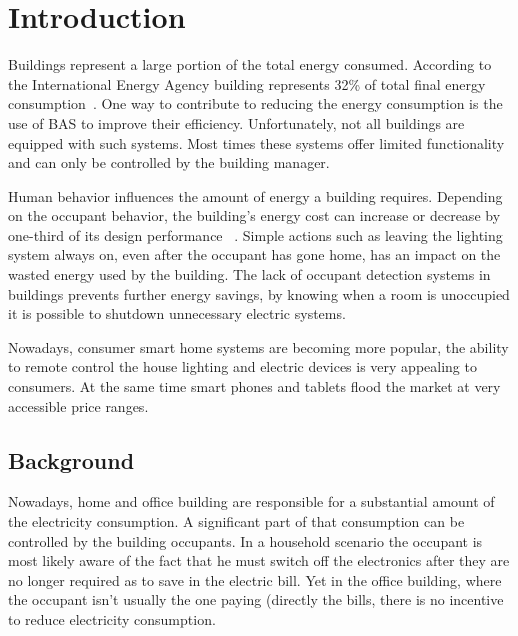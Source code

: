 \chapter{Introduction}
\label{chapter:introduction}
Buildings represent a large portion of the total energy consumed. According to the International Energy Agency building represents 32\% of total final energy consumption~\cite{iea}. One way to contribute to reducing the energy consumption is the use of \ac{BAS} to improve their efficiency. Unfortunately, not all buildings are equipped with such systems. Most times these systems offer limited functionality and can only be controlled by the building manager.

Human behavior influences the amount of energy a building requires. Depending on the occupant behavior, the building's energy cost can increase or decrease by one-third of its design performance ~\cite{ocupancy2}. Simple actions such as leaving the lighting system always on, even after the occupant has gone home, has an impact on the wasted energy used by the building. The lack of occupant detection systems in buildings prevents further energy savings, by knowing when a room is unoccupied it is possible to shutdown unnecessary electric systems.

Nowadays, consumer smart home systems are becoming more popular, the ability to remote control the house lighting and electric devices is very appealing to consumers. At the same time smart phones and tablets flood the market at very accessible price ranges. 

\section{Background}
\label{section:background}
Nowadays, home and office building are responsible for a substantial amount of the electricity consumption. A significant part of that consumption can be controlled by the building occupants. In a household scenario the occupant is most likely aware of the fact that he must switch off the electronics after they are no longer required as to save in the electric bill. Yet in the office building, where the occupant isn't usually the one paying (directly the bills, there is no incentive to reduce electricity consumption.


